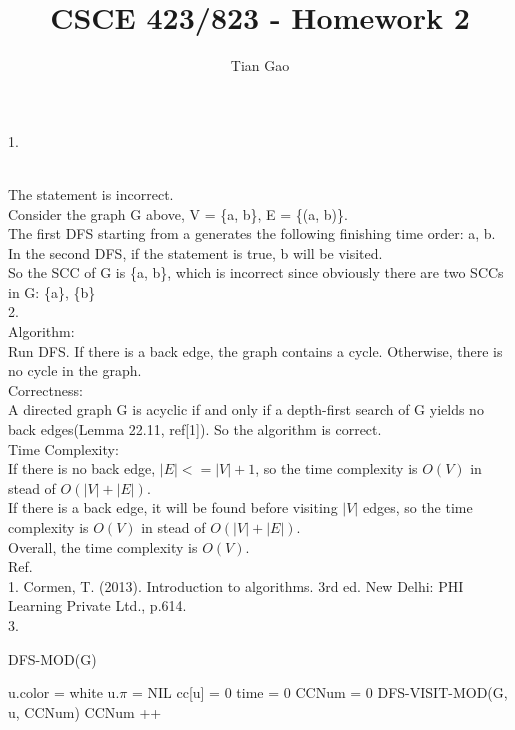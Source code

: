\documentclass{article}
\title{CSCE 423/823 - Homework 2}
\author{Tian Gao}
\begin{document}
\maketitle

1.\\
\\
The statement is incorrect. \\
Consider the graph G above, V = \{a, b\}, E = \{(a, b)\}.\\
The first DFS starting from a generates the following finishing time order: a, b.\\
In the second DFS, if the statement is true, b will be visited. \\
So the SCC of G is \{a, b\}, which is incorrect since obviously there are two SCCs in G: \{a\}, \{b\}\\

2.\\
Algorithm:\\
Run DFS. If there is a back edge, the graph contains a cycle. Otherwise, there is no cycle in the graph.\\

Correctness:\\
A directed graph G is acyclic if and only if a depth-first search of G yields no back edges(Lemma 22.11, ref[1]). So the algorithm is correct.\\

Time Complexity:\\
If there is no back edge, $|E| <= |V| + 1$, so the time complexity is $O(V)$ in stead of $O(|V|+|E|)$.\\
If there is a back edge, it will be found before visiting $|V|$ edges, so the time complexity is $O(V)$ in stead of $O(|V|+|E|)$.\\
Overall, the time complexity is $O(V)$.\\

Ref.\\
1. Cormen, T. (2013). Introduction to algorithms. 3rd ed. New Delhi: PHI Learning Private Ltd., p.614.\\

3.\\
\begin{algorithm}[H]
	\caption{DFS-MOD(G)}
	{
		u.color = white\;
		u.$\pi$ = NIL\;
		cc[u] = 0\;
	}
	time = 0\;
	CCNum = 0\;
	{
		{
			DFS-VISIT-MOD(G, u, CCNum)\;
			CCNum ++\;
		}
	}
\end{algorithm}
\end{document}
